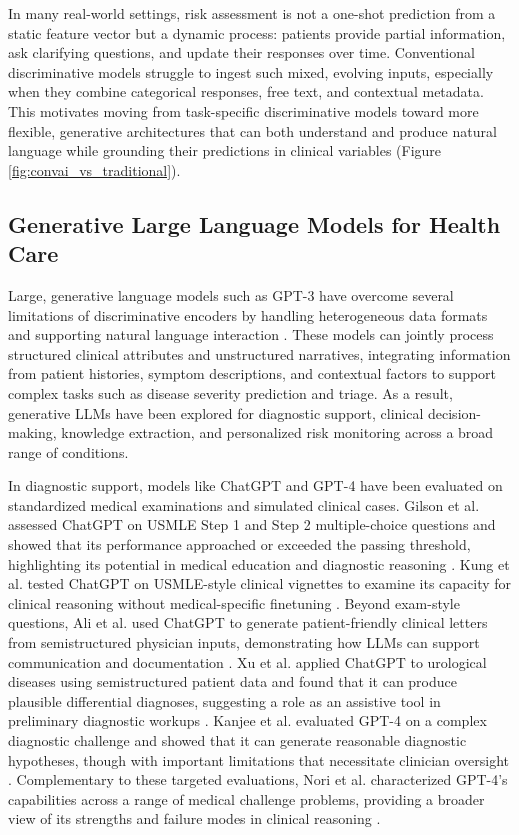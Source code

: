 In many real-world settings, risk assessment is not a one-shot prediction from a static feature vector but a dynamic process: patients provide partial information, ask clarifying questions, and update their responses over time. Conventional discriminative models struggle to ingest such mixed, evolving inputs, especially when they combine categorical responses, free text, and contextual metadata. This motivates moving from task-specific discriminative models toward more flexible, generative architectures that can both understand and produce natural language while grounding their predictions in clinical variables (Figure \ref{fig:convai_vs_traditional}).

\subsection{Generative Large Language Models for Health Care}

Large, generative language models such as GPT-3 have overcome several limitations of discriminative encoders by handling heterogeneous data formats and supporting natural language interaction \cite{brown2020language}. These models can jointly process structured clinical attributes and unstructured narratives, integrating information from patient histories, symptom descriptions, and contextual factors to support complex tasks such as disease severity prediction and triage. As a result, generative LLMs have been explored for diagnostic support, clinical decision-making, knowledge extraction, and personalized risk monitoring across a broad range of conditions.

In diagnostic support, models like ChatGPT and GPT-4 have been evaluated on standardized medical examinations and simulated clinical cases. Gilson et al. assessed ChatGPT on USMLE Step 1 and Step 2 multiple-choice questions and showed that its performance approached or exceeded the passing threshold, highlighting its potential in medical education and diagnostic reasoning \cite{gilson2023chatgpt}. Kung et al. tested ChatGPT on USMLE-style clinical vignettes to examine its capacity for clinical reasoning without medical-specific finetuning \cite{kung2023performance}. Beyond exam-style questions, Ali et al. used ChatGPT to generate patient-friendly clinical letters from semistructured physician inputs, demonstrating how LLMs can support communication and documentation \cite{ali2023chatgpt}. Xu et al. applied ChatGPT to urological diseases using semistructured patient data and found that it can produce plausible differential diagnoses, suggesting a role as an assistive tool in preliminary diagnostic workups \cite{xv2023can}. Kanjee et al. evaluated GPT-4 on a complex diagnostic challenge and showed that it can generate reasonable diagnostic hypotheses, though with important limitations that necessitate clinician oversight \cite{kanjee2023accuracy}. Complementary to these targeted evaluations, Nori et al. characterized GPT-4’s capabilities across a range of medical challenge problems, providing a broader view of its strengths and failure modes in clinical reasoning \cite{nori2023capabilities}.

